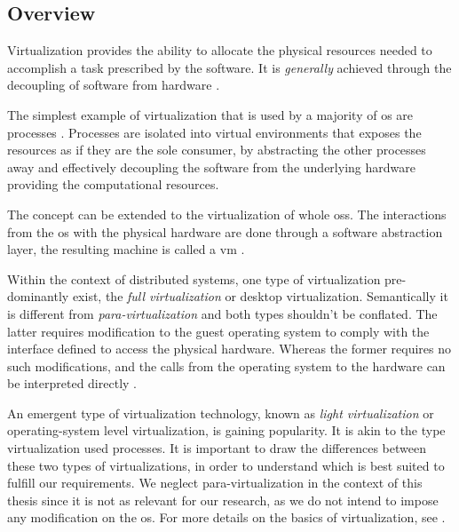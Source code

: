 \documentclass[12pt, titlepage]{uo_temp}
\begin{document}
     \subsection{Overview}
     Virtualization provides the ability to
     allocate the physical resources needed to accomplish a task prescribed by the software.
     It is \emph{generally} achieved through the decoupling of software from hardware
     \cite{tavangarian2012virtual}.

     The simplest example of virtualization that is used by a majority of \gls{os} are
     processes \cite{chisnall2008definitive}. Processes are isolated into virtual
     environments that exposes the resources as if they are the sole consumer, by
     abstracting the other processes away and effectively decoupling the software from the
     underlying hardware providing the computational resources.

     The concept can be extended to the virtualization of whole \gls{os}s. The
     interactions from the \gls{os} with the physical hardware are done through a software
     abstraction layer, the resulting machine is called a \gls{vm}
     \cite{semnanian2011virtualization}.

     Within the context of distributed systems, one type of virtualization pre-dominantly
     exist, the \emph{full virtualization} or desktop virtualization. Semantically it is
     different from \emph{para-virtualization} and both types shouldn't be conflated. The
     latter requires modification to the guest operating system to comply with the
     interface defined to access the physical hardware. Whereas the former requires no
     such modifications, and the calls from the operating system to the hardware can be
     interpreted directly \cite{tavangarian2012virtual}.

     An emergent type of virtualization technology, known as \emph{light virtualization}
     or operating-system level virtualization, is gaining popularity. It is akin to the
     type virtualization used processes. It is important to draw the differences between
     these two types of virtualizations, in order to understand which is best suited to
     fulfill our requirements. We neglect para-virtualization in the context of this
     thesis since it is not as relevant for our research, as we do not intend to impose
     any modification on the \gls{os}. For more details on the basics of virtualization,
     see \cite{tavangarian2012virtual} \cite{barham2003xen}.
\end{document}
